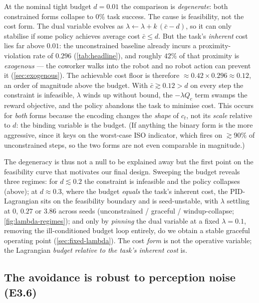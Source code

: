 At the nominal tight budget $d = 0.01$ the comparison is \emph{degenerate}: both
constrained forms collapse to $0\%$ task success. The cause is feasibility, not
the cost form. The dual variable evolves as
$\lambda \leftarrow \lambda + k\,(\bar c - d)$, so it can only stabilise if some
policy achieves average cost $\bar c \le d$. But the task's \emph{inherent} cost
lies far above $0.01$: the unconstrained baseline already incurs a
proximity-violation rate of $0.296$ (\cref{tab:headline}), and roughly $42\%$ of
that proximity is \emph{exogenous} --- the coworker walks into the robot and no
robot action can prevent it (\cref{sec:exogenous}). The achievable cost floor is
therefore $\approx 0.42 \times 0.296 \approx 0.12$, an order of magnitude above
the budget. With $\bar c \gtrsim 0.12 > d$ on every step the constraint is
infeasible, $\lambda$ winds up without bound, the $-\lambda Q_c$ term swamps the
reward objective, and the policy abandons the task to minimise cost. This occurs
for \emph{both} forms because the encoding changes the \emph{shape} of $c_t$, not
its \emph{scale} relative to $d$: the binding variable is the budget. (If
anything the binary form is the more aggressive, since it keys on the worst-case
ISO indicator, which fires on $\gtrsim 90\%$ of unconstrained steps, so the two
forms are not even comparable in magnitude.)

The degeneracy is thus not a null to be explained away but the first point on the
feasibility curve that motivates our final design. Sweeping the budget reveals
three regimes: for $d \lesssim 0.2$ the constraint is infeasible and the policy
collapses (above); at $d \approx 0.3$, where the budget \emph{equals} the task's
inherent cost, the PID-Lagrangian sits on the feasibility boundary and is
seed-unstable, with $\lambda$ settling at $0$, $0.27$ or $3.86$ across seeds
(unconstrained / graceful / windup-collapse; \cref{fig:lambda-regimes}); and only
by \emph{pinning} the dual variable at a fixed $\lambda = 0.1$, removing the
ill-conditioned budget loop entirely, do we obtain a stable graceful operating
point (\cref{sec:fixed-lambda}). The cost \emph{form} is not the operative
variable; the Lagrangian \emph{budget relative to the task's inherent cost} is.


\subsection{The avoidance is robust to perception noise (E3.6)}
\label{sec:perception}

